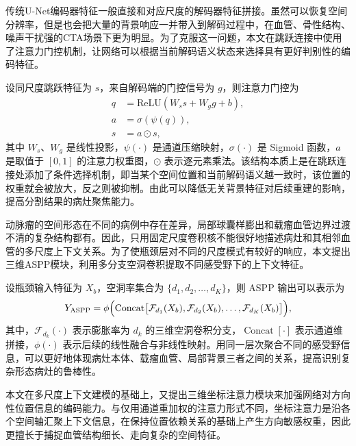 传统U-Net编码器特征一般直接和对应尺度的解码器特征拼接。虽然可以恢复空间分辨率，但是也会把大量的背景响应一并带入到解码过程中，在血管、骨性结构、噪声干扰强的CTA场景下更为明显。为了克服这一问题，本文在跳跃连接中使用了注意力门控机制，让网络可以根据当前解码语义状态来选择具有更好判别性的编码特征。

设同尺度跳跃特征为 $s$，来自解码端的门控信号为 $g$，则注意力门控为
\begin{equation}
\begin{aligned}
q &= \mathrm{ReLU}(W_s s + W_g g + b),\\
a &= \sigma(\psi(q)),\\
\hat{s} &= a \odot s,
\end{aligned}
\label{eq:attention-gate}
\end{equation}
其中 $W_s$、$W_g$ 是线性投影，$\psi(\cdot)$ 是通道压缩映射，$\sigma(\cdot)$ 是 Sigmoid 函数，$a$ 是取值于 $[0,1]$ 的注意力权重图，$\odot$ 表示逐元素乘法。该结构本质上是在跳跃连接处添加了条件选择机制，即当某个空间位置和当前解码语义越一致时，该位置的权重就会被放大，反之则被抑制。由此可以降低无关背景特征对后续重建的影响，提高分割结果的病灶聚焦能力。

动脉瘤的空间形态在不同的病例中存在差异，局部球囊样膨出和载瘤血管边界过渡不清的复杂结构都有。因此，只用固定尺度卷积核不能很好地描述病灶和其相邻血管的多尺度上下文关系。为了使瓶颈层对不同的尺度模式有较好的响应，本文提出三维ASPP模块，利用多分支空洞卷积提取不同感受野下的上下文特征。

设瓶颈输入特征为 $X_b$，空洞率集合为 $\{d_1,d_2,\ldots,d_K\}$，则 ASPP 输出可以表示为
\begin{equation}
Y_{\mathrm{ASPP}} = \phi\Bigl(\operatorname{Concat}\bigl[\mathcal{F}_{d_1}(X_b),\mathcal{F}_{d_2}(X_b),\ldots,\mathcal{F}_{d_K}(X_b)\bigr]\Bigr),
\label{eq:aspp}
\end{equation}
其中，$\mathcal{F}_{d_k}(\cdot)$ 表示膨胀率为 $d_k$ 的三维空洞卷积分支，$\operatorname{Concat}[\cdot]$ 表示通道维拼接，$\phi(\cdot)$ 表示后续的线性融合与非线性映射。用同一层次聚合不同的感受野信息，可以更好地体现病灶本体、载瘤血管、局部背景三者之间的关系，提高识别复杂形态病灶的鲁棒性。

本文在多尺度上下文建模的基础上，又提出三维坐标注意力模块来加强网络对方向性位置信息的编码能力。与仅用通道重加权的注意力形式不同，坐标注意力是沿各个空间轴汇聚上下文信息，在保持位置依赖关系的基础上产生方向敏感权重，因此更擅长于捕捉血管结构细长、走向复杂的空间特征。

